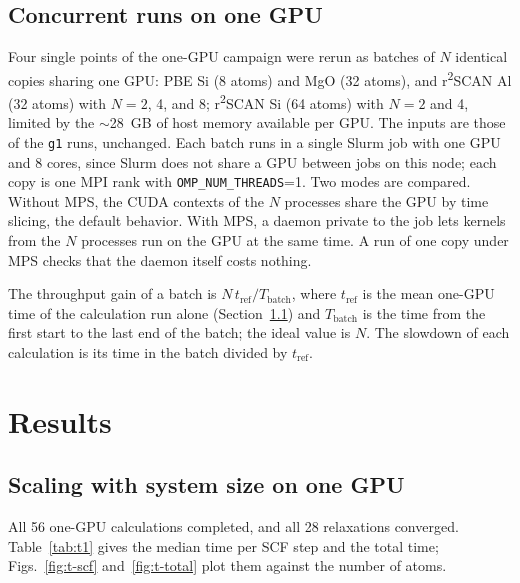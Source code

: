 \documentclass[11pt,letterpaper]{article}
\begin{document}
\subsection{Concurrent runs on one GPU}
\label{sec:conc-methods}
Four single points of the one-GPU campaign were rerun as batches of $N$ identical copies sharing
one GPU: PBE Si (8 atoms) and MgO (32 atoms), and r\textsuperscript{2}SCAN Al (32 atoms) with
$N=2$, 4, and 8; r\textsuperscript{2}SCAN Si (64 atoms) with $N=2$ and 4, limited by the
$\sim$\SI{28}{GB} of host memory available per GPU. The inputs are those of the \texttt{g1} runs,
unchanged. Each batch runs in a single Slurm job with one GPU and 8 cores, since Slurm does not
share a GPU between jobs on this node; each copy is one MPI rank with
\texttt{OMP\_NUM\_THREADS}=1. Two modes are compared. Without MPS, the CUDA contexts of the $N$
processes share the GPU by time slicing, the default behavior. With MPS, a daemon private to the
job lets kernels from the $N$ processes run on the GPU at the same time. A run of one copy under
MPS checks that the daemon itself costs nothing.

The throughput gain of a batch is $N\,t_\text{ref}/T_\text{batch}$, where $t_\text{ref}$ is the
mean one-GPU time of the calculation run alone (Section~\ref{sec:res-scaling}) and
$T_\text{batch}$ is the time from the first start to the last end of the batch; the ideal value
is $N$. The slowdown of each calculation is its time in the batch divided by $t_\text{ref}$.

\section{Results}
\label{sec:results}

\subsection{Scaling with system size on one GPU}
\label{sec:res-scaling}
All 56 one-GPU calculations completed, and all 28 relaxations converged. Table~\ref{tab:t1}
gives the median time per SCF step and the total time; Figs.~\ref{fig:t-scf}
and~\ref{fig:t-total} plot them against the number of atoms.
\end{document}

